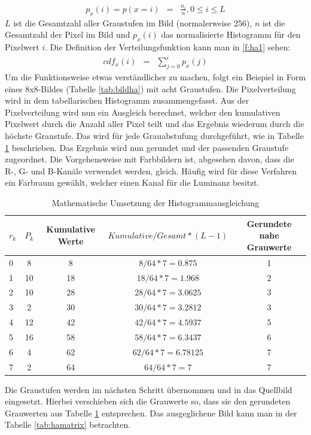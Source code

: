 \begin{eqnarray} \label{f:ha1} p_{x}(i)=p(x=i)&=&\frac{n_{i}}{n}, 0\leq i \leq L \end{eqnarray}
$L$ ist die Gesamtzahl aller Graustufen im Bild (normalerweise 256), $n$ ist die Gesamtzahl der Pixel im Bild und $p_{x}(i)$ das normalisierte Histogramm für den Pixelwert $i$. Die Definition der Verteilungsfunktion kann man in \ref{f:ha1} sehen:
\begin{eqnarray} cdf_{x}(i) &=& \sum_{j=0}^i p_{x}(j)\end{eqnarray}
Um die Funktionsweise etwas verständlicher zu machen, folgt ein Beispiel in Form eines 8x8-Bildes (Tabelle \ref{tab:bildha}) mit acht Graustufen. Die Pixelverteilung wird in dem tabellarischen Histogramm zusammengefasst.  
Aus der Pixelverteilung wird nun ein Ausgleich berechnet, welcher den kumulativen Pixelwert durch die Anzahl aller Pixel teilt und das Ergebnis wiederum durch die höchste Graustufe. Das wird für jede Grauabstufung durchgeführt, wie in Tabelle \ref{tab:haberechnung} beschrieben.
 Das Ergebnis wird nun gerundet und der passenden Graustufe zugeordnet. Die Vorgehensweise mit Farbbildern ist, abgesehen davon, dass die R-, G- und B-Kanäle verwendet werden, gleich. Häufig wird für diese Verfahren ein Farbraum gewählt, welcher einen Kanal für die Luminanz besitzt.
  \begin{table}
  [h]
  \caption{Mathematische Umsetzung der Histogrammausgleichung}
  \label{tab:haberechnung}
  \centering
  \begin{tabular}{|l|c|c|c|c|}
  \hline
  $r_{k}$ & $P_{k}$ & Kumulative Werte & $Kumulative/Gesamt*(L-1)$ & Gerundete nahe Grauwerte\\
  \hline
  0 & 8 & 8 & $8/64*7=0.875$ & 1\\
  \hline
  1 & 10 & 18 & $18/64*7=1.968$ & 2\\
  \hline
  2 & 10 & 28 & $28/64*7=3.0625$ & 3\\
  \hline
  3 & 2 & 30 & $30/64*7=3.2812$ & 3\\
  \hline
  4 & 12 & 42 & $42/64*7=4.5937$ & 5\\
  \hline
  5 & 16 & 58 & $58/64*7=6.3437$ & 6\\
  \hline
  6 & 4 & 62 & $62/64*7=6.78125$ & 7\\
  \hline
  7 & 2 & 64 & $64/64*7=7$ & 7\\
  \hline
  \end{tabular}
  \end{table}
Die Graustufen werden im nächsten Schritt übernommen und in das Quellbild eingesetzt. Hierbei verschieben sich die Grauwerte so, dass sie den gerundeten Grauwerten aus Tabelle \ref{tab:haberechnung} entsprechen. Das ausgeglichene Bild kann man in der Tabelle \ref{tab:hamatrix} betrachten. 
